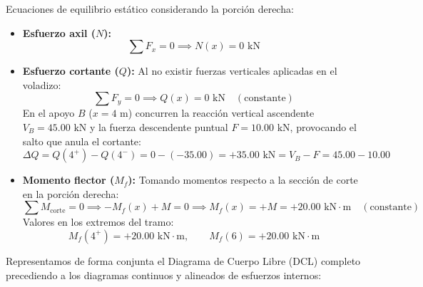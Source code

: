 Ecuaciones de equilibrio estático considerando la porción derecha:
\begin{itemize}
    \item \textbf{Esfuerzo axil ($N$):}
          \begin{equation}
              \sum F_x = 0 \implies \boxed{N(x) = 0\text{ kN}}
          \end{equation}

    \item \textbf{Esfuerzo cortante ($Q$):}
          Al no existir fuerzas verticales aplicadas en el voladizo:
          \begin{equation}
              \sum F_y = 0 \implies \boxed{Q(x) = 0\text{ kN}} \quad (\text{constante})
          \end{equation}
          En el apoyo $B$ ($x = 4\text{ m}$) concurren la reacción vertical ascendente $V_B = 45.00\text{ kN}$ y la fuerza descendente puntual $F = 10.00\text{ kN}$, provocando el salto que anula el cortante:
          \begin{equation}
              \Delta Q = Q(4^+) - Q(4^-) = 0 - (-35.00) = +35.00\text{ kN} = V_B - F = 45.00 - 10.00
          \end{equation}

    \item \textbf{Momento flector ($M_f$):}
          Tomando momentos respecto a la sección de corte en la porción derecha:
          \begin{equation}
              \sum M_{\text{corte}} = 0 \implies -M_f(x) + M = 0 \implies \boxed{M_f(x) = +M = +20.00\text{ kN}\cdot\text{m}} \quad (\text{constante})
          \end{equation}
          Valores en los extremos del tramo:
          \begin{equation*}
              M_f(4^+) = +20.00\text{ kN}\cdot\text{m}, \qquad M_f(6) = +20.00\text{ kN}\cdot\text{m}
          \end{equation*}
\end{itemize}


Representamos de forma conjunta el Diagrama de Cuerpo Libre (DCL) completo precediendo a los diagramas continuos y alineados de esfuerzos internos:

